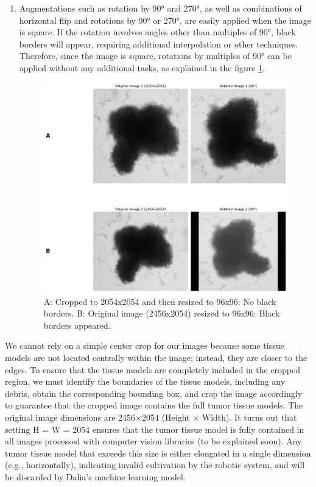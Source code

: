\begin{enumerate}
\begin{enumerate}
      \item Augmentations such as rotation by 90° and 270°, as well as combinations of horizontal flip and rotations by 90° or 270°, are easily applied when the image is square. If the rotation involves angles other than multiples of 90°, black borders will appear, requiring additional interpolation or other techniques. Therefore, since the image is square, rotations by multiples of 90° can be applied without any additional tasks, as explained in the figure \ref{fig:rotation}.
       \begin{figure}[H]
        \centering
        \includegraphics[scale=0.3]{figures/rotation.png} 
        \caption{A: Cropped to 2054x2054 and then resized to 96x96: No black borders. B: Original image (2456x2054) resized to 96x96: Black borders appeared.}
        \label{fig:rotation}
      \end{figure}
    \end{enumerate}
  We cannot rely on a simple center crop for our images because some tissue models are not located centrally within the image; instead, they are closer to the edges. To ensure that the tissue models are completely included in the cropped region, we must identify the boundaries of the tissue models, including any debris, obtain the corresponding bounding box, and crop the image accordingly to guarantee that the cropped image contains the full tumor tissue models. The original image dimensions are 2456×2054 (Height × Width). It turns out that setting H = W = 2054 ensures that the tumor tissue model is fully contained in all images processed with computer vision libraries (to be explained soon). Any tumor tissue model that exceeds this size is either elongated in a single dimension (e.g., horizontally), indicating invalid cultivation by the robotic system, and will be discarded by Dalia's machine learning model.

\end{enumerate}
